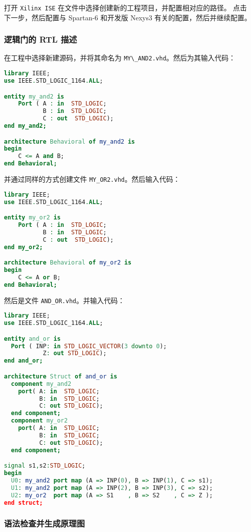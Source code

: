 \documentclass{ctexart}
\begin{document}
打开 \verb|Xilinx ISE| 在文件中选择创建新的工程项目，并配置相对应的路径。
点击下一步，然后配置与 Spartan-6 和开发版 Nexys3 有关的配置，然后并继续配置。

\subsubsection{逻辑门的 RTL 描述}

在工程中选择新建源码，并将其命名为 \verb|MY\_AND2.vhd|。然后为其输入代码：
\begin{lstlisting}[language=VHDL]
library IEEE;
use IEEE.STD_LOGIC_1164.ALL;

entity my_and2 is
    Port ( A : in  STD_LOGIC;
           B : in  STD_LOGIC;
           C : out  STD_LOGIC);
end my_and2;

architecture Behavioral of my_and2 is
begin
	C <= A and B;
end Behavioral;
\end{lstlisting}

并通过同样的方式创建文件 \verb|MY_OR2.vhd|。然后输入代码：
\begin{lstlisting}[language=VHDL]
library IEEE;
use IEEE.STD_LOGIC_1164.ALL;

entity my_or2 is
    Port ( A : in  STD_LOGIC;
           B : in  STD_LOGIC;
           C : out  STD_LOGIC);
end my_or2;

architecture Behavioral of my_or2 is
begin
	C <= A or B;
end Behavioral;
\end{lstlisting}

然后是文件 \verb|AND_OR.vhd|。并输入代码：
\begin{lstlisting}[language=VHDL]
library IEEE;
use IEEE.STD_LOGIC_1164.ALL;

entity and_or is
  Port ( INP: in STD_LOGIC_VECTOR(3 downto 0);
           Z: out STD_LOGIC);
end and_or;

architecture Struct of and_or is
  component my_and2
    port( A: in  STD_LOGIC;
          B: in  STD_LOGIC;
          C: out STD_LOGIC);
  end component;
  component my_or2
    port( A: in  STD_LOGIC;
          B: in  STD_LOGIC;
          C: out STD_LOGIC);
  end component;

signal s1,s2:STD_LOGIC;
begin
  U0: my_and2 port map (A => INP(0), B => INP(1), C => s1);
  U1: my_and2 port map (A => INP(2), B => INP(3), C => s2);
  U2: my_or2  port map (A => S1    , B => S2    , C => Z );
end struct;
\end{lstlisting}

\subsubsection{语法检查并生成原理图}
\end{document}
